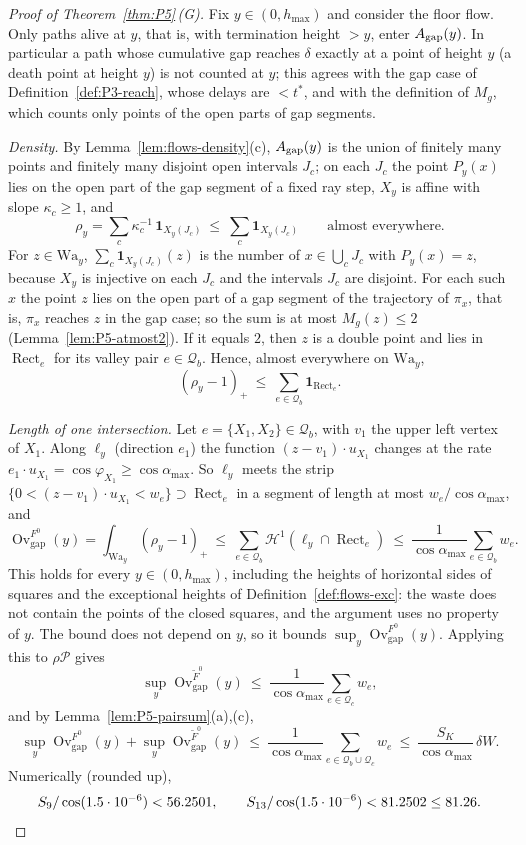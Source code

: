 \documentclass[11pt]{amsart}
\newcommand{\cP}{\mathcal P}
\newcommand{\Ovgap}{\operatorname{Ov}_{\mathrm{gap}}}
\newcommand{\amax}{\alpha_{\max}}
\newcommand{\hmax}{h_{\max}}
\newcommand{\Fz}{F^{0}}
\theoremstyle{definition}
\theoremstyle{remark}
\numberwithin{equation}{section}
\begin{document}
\begin{proof}[Proof of Theorem~\ref{thm:P5}\,\textup{(G)}]
Fix $y\in(0,\hmax)$ and consider the floor flow. Only paths alive at $y$, that is, with termination height $>y$, enter $A_{\rm gap}(y)$. In particular a path whose cumulative gap reaches $\delta$ exactly at a point of height $y$ (a death point at height $y$) is not counted at $y$; this agrees with the gap case of Definition~\ref{def:P3-reach}, whose delays are $<t^*$, and with the definition of $M_g$, which counts only points of the open parts of gap segments.

\emph{Density.} By Lemma~\ref{lem:flows-density}(c), $A_{\rm gap}(y)$ is the union of finitely many points and finitely many disjoint open intervals $J_c$; on each $J_c$ the point $P_y(x)$ lies on the open part of the gap segment of a fixed ray step, $X_y$ is affine with slope $\kappa_c\ge1$, and
\[
\rho_y=\sum_c\kappa_c^{-1}\,\mathbf 1_{X_y(J_c)}\ \le\ \sum_c\mathbf 1_{X_y(J_c)}\qquad\text{almost everywhere.}
\]
For $z\in\mathrm{Wa}_y$, $\sum_c\mathbf 1_{X_y(J_c)}(z)$ is the number of $x\in\bigcup_cJ_c$ with $P_y(x)=z$, because $X_y$ is injective on each $J_c$ and the intervals $J_c$ are disjoint. For each such $x$ the point $z$ lies on the open part of a gap segment of the trajectory of $\pi_x$, that is, $\pi_x$ reaches $z$ in the gap case; so the sum is at most $M_g(z)\le2$ (Lemma~\ref{lem:P5-atmost2}). If it equals $2$, then $z$ is a double point and lies in $\operatorname{Rect}_e$ for its valley pair $e\in\mathcal Q_b$. Hence, almost everywhere on $\mathrm{Wa}_y$,
\[
(\rho_y-1)_+\ \le\ \sum_{e\in\mathcal Q_b}\mathbf 1_{\operatorname{Rect}_e}.
\]

\emph{Length of one intersection.} Let $e=\{X_1,X_2\}\in\mathcal Q_b$, with $v_1$ the upper left vertex of $X_1$. Along $\ell_y$ (direction $e_1$) the function $(z-v_1)\cdot u_{X_1}$ changes at the rate $e_1\cdot u_{X_1}=\cos\varphi_{X_1}\ge\cos\amax$. So $\ell_y$ meets the strip $\{0<(z-v_1)\cdot u_{X_1}<w_e\}\supset\operatorname{Rect}_e$ in a segment of length at most $w_e/\cos\amax$, and
\[
\Ovgap^{\Fz}(y)=\int_{\mathrm{Wa}_y}(\rho_y-1)_+\ \le\ \sum_{e\in\mathcal Q_b}\mathcal H^1(\ell_y\cap\operatorname{Rect}_e)\ \le\ \frac1{\cos\amax}\sum_{e\in\mathcal Q_b}w_e .
\]
This holds for every $y\in(0,\hmax)$, including the heights of horizontal sides of squares and the exceptional heights of Definition~\ref{def:flows-exc}: the waste does not contain the points of the closed squares, and the argument uses no property of $y$. The bound does not depend on $y$, so it bounds $\sup_y\Ovgap^{\Fz}(y)$. Applying this to $\rho\cP$ gives
\[
\sup_y\Ovgap^{\tilde F^0}(y)\ \le\ \frac1{\cos\amax}\sum_{e\in\mathcal Q_c}w_e ,
\]
and by Lemma~\ref{lem:P5-pairsum}(a),(c),
\[
\sup_y\Ovgap^{\Fz}(y)+\sup_y\Ovgap^{\tilde F^0}(y)\ \le\ \frac1{\cos\amax}\sum_{e\in\mathcal Q_b\cup\mathcal Q_c}w_e\ \le\ \frac{S_K}{\cos\amax}\,\delta W .
\]
Numerically (rounded up),
\[
S_9/\cos(1.5\cdot10^{-6})<56.2501,\qquad S_{13}/\cos(1.5\cdot10^{-6})<81.2502\le81.26 . \qedhere
\]
\end{proof}
\end{document}
